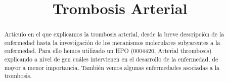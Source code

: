 \documentclass{bmcart}
\begin{document}
	\begin{frontmatter}
	
		\begin{fmbox}
			
			
			\title{Trombosis Arterial}
			
			
			\author[
			  addressref={aff1},                   %
			  corref={aff1},                       %
			  email={pablomolinasanchez01@uma.es}   %
			]{ } %
			\author[
			  addressref={aff1},
			  email={hugoavalos@uma.es}
			]{ }
			
			
			\address[id=aff1]{%
			  ,             %
			  ,          %
			  ,                              %
			}
		
		\end{fmbox}%
		
		\begin{abstractbox}
		
			\begin{abstract} %
			Artículo en el que explicamos la trombosis arterial, desde la breve descripción de la enfermedad hasta la investigación de los mecanismos moleculares subyacentes a la enfermedad. Para ello hemos utilizado un HPO (0004420, Arterial thrombosis) explicando a nivel de gen cuáles intervienen en el desarrollo de la enfermedad, de mayor a menor importancia. También vemos algunas enfermedades asociadas a la trombosis.
			

\end{abstract}
\end{abstractbox}
\end{frontmatter}
\end{document}
